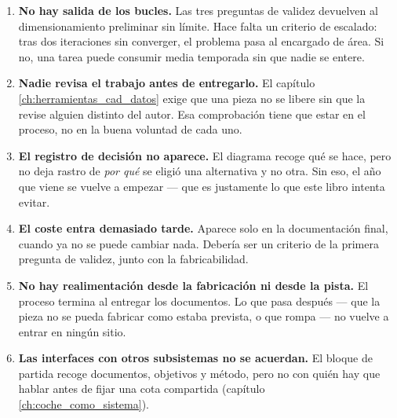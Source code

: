 \begin{enumerate}
  \item \textbf{No hay salida de los bucles.} Las tres preguntas de validez
        devuelven al dimensionamiento preliminar sin límite. Hace falta un
        criterio de escalado: tras dos iteraciones sin converger, el problema
        pasa al encargado de área. Si no, una tarea puede consumir media
        temporada sin que nadie se entere.
  \item\label{item:huecos:revision} \textbf{Nadie revisa el trabajo antes de
        entregarlo.} El capítulo
        \ref{ch:herramientas_cad_datos} exige que una pieza no se libere sin que
        la revise alguien distinto del autor. Esa comprobación tiene que estar en
        el proceso, no en la buena voluntad de cada uno.
  \item\label{item:huecos:ddr} \textbf{El registro de decisión no aparece.} El diagrama recoge qué se
        hace, pero no deja rastro de \emph{por qué} se eligió una alternativa y
        no otra. Sin eso, el año que viene se vuelve a empezar --- que es
        justamente lo que este libro intenta evitar.
  \item \textbf{El coste entra demasiado tarde.} Aparece solo en la
        documentación final, cuando ya no se puede cambiar nada. Debería ser un
        criterio de la primera pregunta de validez, junto con la fabricabilidad.
  \item\label{item:huecos:validacion} \textbf{No hay realimentación desde la fabricación ni desde la pista.}
        El proceso termina al entregar los documentos. Lo que pasa después ---
        que la pieza no se pueda fabricar como estaba prevista, o que rompa ---
        no vuelve a entrar en ningún sitio.
  \item\label{item:huecos:interfaces} \textbf{Las interfaces con otros subsistemas no se acuerdan.} El bloque
        de partida recoge documentos, objetivos y método, pero no con quién hay
        que hablar antes de fijar una cota compartida (capítulo
        \ref{ch:coche_como_sistema}).
\end{enumerate}



